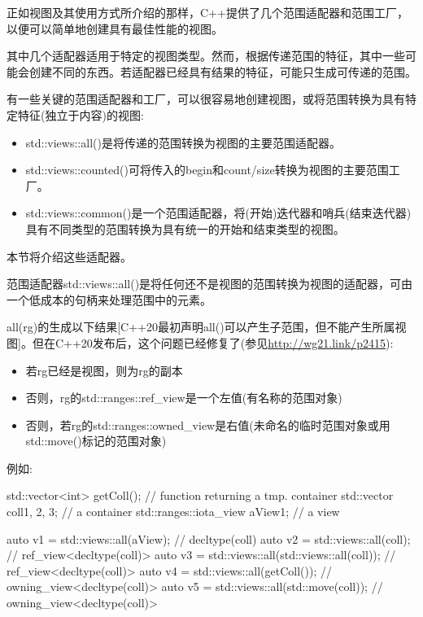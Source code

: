 
正如视图及其使用方式所介绍的那样，C++提供了几个范围适配器和范围工厂，以便可以简单地创建具有最佳性能的视图。

其中几个适配器适用于特定的视图类型。然而，根据传递范围的特征，其中一些可能会创建不同的东西。若适配器已经具有结果的特征，可能只生成可传递的范围。

有一些关键的范围适配器和工厂，可以很容易地创建视图，或将范围转换为具有特定特征(独立于内容)的视图:

\begin{itemize}
\item
std::views::all()是将传递的范围转换为视图的主要范围适配器。

\item
std::views::counted()可将传入的begin和count/size转换为视图的主要范围工厂。

\item
std::views::common()是一个范围适配器，将(开始)迭代器和哨兵(结束迭代器)具有不同类型的范围转换为具有统一的开始和结束类型的视图。
\end{itemize}

本节将介绍这些适配器。


范围适配器std::views::all()是将任何还不是视图的范围转换为视图的适配器，可由一个低成本的句柄来处理范围中的元素。

all(rg)的生成以下结果[C++20最初声明all()可以产生子范围，但不能产生所属视图]。但在C++20发布后，这个问题已经修复了(参见\url{http://wg21.link/p2415}):

\begin{itemize}
\item
若rg已经是视图，则为rg的副本

\item
否则，rg的std::ranges::ref\_view是一个左值(有名称的范围对象)

\item
否则，若rg的std::ranges::owned\_view是右值(未命名的临时范围对象或用std::move()标记的范围对象)
\end{itemize}

例如:

\begin{cpp}
std::vector<int> getColl(); // function returning a tmp. container
std::vector coll{1, 2, 3}; // a container
std::ranges::iota_view aView{1}; // a view

auto v1 = std::views::all(aView); // decltype(coll)
auto v2 = std::views::all(coll); // ref_view<decltype(coll)>
auto v3 = std::views::all(std::views::all(coll)); // ref_view<decltype(coll)>
auto v4 = std::views::all(getColl()); // owning_view<decltype(coll)>
auto v5 = std::views::all(std::move(coll)); // owning_view<decltype(coll)>
\end{cpp}


